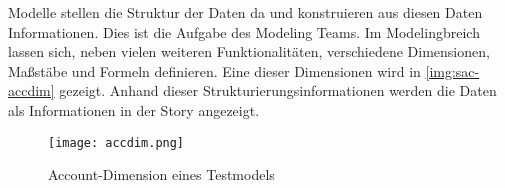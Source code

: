 Modelle stellen die Struktur der Daten da und konstruieren aus diesen Daten Informationen. Dies ist die Aufgabe des Modeling Teams.
Im Modelingbreich lassen sich, neben vielen weiteren Funktionalitäten, verschiedene Dimensionen, Maßstäbe und Formeln definieren.
Eine dieser Dimensionen wird in \autoref{img:sac-accdim} gezeigt. 
Anhand dieser Strukturierungsinformationen werden die Daten als Informationen in der Story angezeigt.
\begin{figure}[ht]
	\centering
	\texttt{[image: accdim.png]}
	\caption{Account-Dimension eines Testmodels}
	\label{img:sac-accdim}
\end{figure}

